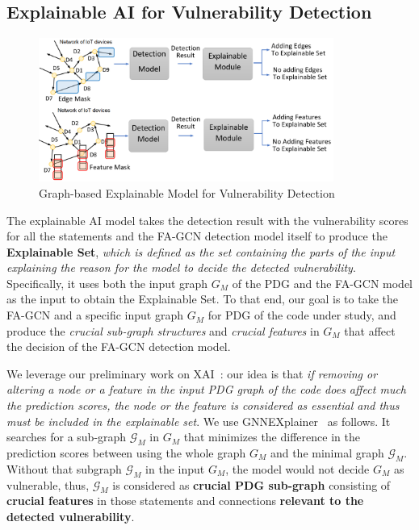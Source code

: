 \subsection{Explainable AI for Vulnerability Detection}
\label{sec:xai}

\begin{figure}[!hbt]
    \centering
    \includegraphics[width=3.8in]{xai-example.png}
    \caption{Graph-based Explainable Model for Vulnerability Detection}
    \label{fig:xai}
\end{figure}


The explainable AI model takes the detection result with the
vulnerability scores for all the statements and the FA-GCN detection
model itself to produce the {\bf Explainable Set}, {\em which is
  defined as the set containing the parts of the input explaining the
  reason for the model to decide the detected
  vulnerability}. Specifically, it uses both the input graph $G_M$ of
the PDG and the FA-GCN model as the input to obtain the Explainable
Set.
To that end, our goal is to take the FA-GCN and a specific input graph
$G_M$ for PDG of the code under study, and produce the {\em crucial
  sub-graph structures} and {\em crucial features} in $G_M$ that
affect the decision of the FA-GCN detection model.

We leverage our preliminary work on XAI~\cite{fse21-submission}: our
idea is that {\em if removing or altering a node or a feature in the
  input PDG graph of the code does affect much the prediction scores,
  the node or the feature is considered as essential and thus must be
  included in the explainable set}. We use
GNNEXplainer~\cite{GNNExplainer} as follows. It searches for a
sub-graph $\mathcal{G}_M$ in $G_M$ that minimizes the difference in
the prediction scores between using the whole graph $G_M$ and the
minimal graph $\mathcal{G}_M$. Without that subgraph $\mathcal{G}_M$
in the input $G_M$, the model would not decide $G_M$ as vulnerable,
thus, $\mathcal{G}_M$ is considered as {\bf crucial PDG sub-graph}
consisting of {\bf crucial features} in those statements and
connections {\bf relevant to the detected vulnerability}.

